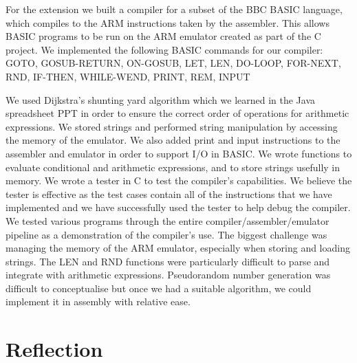 \documentclass[11pt, letterpaper]{article}
\begin{document}
For the extension we built a compiler for a subset of the BBC BASIC language, which compiles to the ARM instructions taken by the assembler. This allows BASIC programs to be run on the ARM emulator created as part of the C project. We implemented the following BASIC commands for our compiler: GOTO, GOSUB-RETURN, ON-GOSUB, LET, LEN, DO-LOOP, FOR-NEXT, RND, IF-THEN, WHILE-WEND, PRINT, REM, INPUT 

We used Dijkstra's shunting yard algorithm which we learned in the Java spreadsheet PPT in order to ensure the correct order of operations for arithmetic expressions. We stored strings and performed string manipulation by accessing the memory of the emulator. We also added print and input instructions to the assembler and emulator in order to support I/O in BASIC.
We wrote functions to evaluate conditional and arithmetic expressions, and to store strings usefully in memory. We wrote a tester in C to test the compiler's capabilities. We believe the tester is effective as the test cases contain all of the instructions that we have implemented and we have successfully used the tester to help debug the compiler. We tested various programs through the entire compiler/assembler/emulator pipeline as a demonstration of the compiler's use.
The biggest challenge was managing the memory of the ARM emulator, especially when storing and loading strings. The LEN and RND functions were particularly difficult to parse and integrate with arithmetic expressions. Pseudorandom number generation was difficult to conceptualise but once we had a suitable algorithm, we could implement it in assembly with relative ease.

\section{Reflection}
\end{document}

